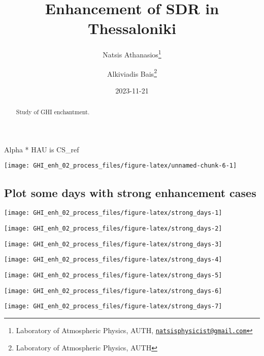 \documentclass[
  10pt,
  a4paper,oneside]{article}
\title{Enhancement of SDR in Thessaloniki}
\author{Natsis Athanasios\footnote{Laboratory of Atmospheric Physics, AUTH, \href{mailto:natsisphysicist@gmail.com}{\nolinkurl{natsisphysicist@gmail.com}}} \and Alkiviadis Bais\footnote{Laboratory of Atmospheric Physics, AUTH}}
\date{2023-11-21}
\begin{document}
\maketitle
\begin{abstract}
Study of GHI enchantment.
\end{abstract}

{
\hypersetup{linkcolor=}
\setcounter{tocdepth}{4}
\tableofcontents
}
Alpha * HAU is CS\_ref

\begin{center}\texttt{[image: GHI\_enh\_02\_process\_files/figure-latex/unnamed-chunk-6-1]} \end{center}

\hypertarget{plot-some-days-with-strong-enhancement-cases}{%
\subsection{Plot some days with strong enhancement cases}\label{plot-some-days-with-strong-enhancement-cases}}

\begin{center}\texttt{[image: GHI\_enh\_02\_process\_files/figure-latex/strong\_days-1]} \end{center}

\begin{center}\texttt{[image: GHI\_enh\_02\_process\_files/figure-latex/strong\_days-2]} \end{center}

\begin{center}\texttt{[image: GHI\_enh\_02\_process\_files/figure-latex/strong\_days-3]} \end{center}

\begin{center}\texttt{[image: GHI\_enh\_02\_process\_files/figure-latex/strong\_days-4]} \end{center}

\begin{center}\texttt{[image: GHI\_enh\_02\_process\_files/figure-latex/strong\_days-5]} \end{center}

\begin{center}\texttt{[image: GHI\_enh\_02\_process\_files/figure-latex/strong\_days-6]} \end{center}

\begin{center}\texttt{[image: GHI\_enh\_02\_process\_files/figure-latex/strong\_days-7]} \end{center}
\end{document}
